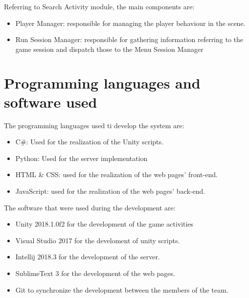  	Referring to Search Activity module, the main components are:
 	\begin{itemize}
 		\item {Player Manager:} responsible for managing the player behaviour in the scene.
 		\item {Run Session Manager:} responsible for gathering information referring to the game session and dispatch those to the Menu Session Manager
 	\end{itemize}
 
	\section{Programming languages and software used}
	The programming languages used ti develop the system are:
	\begin{itemize}
		\item C\#: Used for the realization of the Unity scripts.
		\item Python: Used for the server implementation
		\item HTML \& CSS: used for the realization of the web pages’ front-end.
		\item JavaScript: used for the realization of the web pages’ back-end.
	\end{itemize}
	\noindent
	The software that were used during the development are:
	\begin{itemize}
		\item Unity 2018.1.0f2 for the development of the game activities
		\item Visual Studio 2017 for the develoment of unity scripts.
		\item Intellij 2018.3 for the development of the server.
		\item SublimeText 3 for the development of the web pages.
		\item Git to synchronize the development between the members of the team.
	\end{itemize}
	
	
 	
	
	
	
	
		
		
		 
	
	
	
	
	


